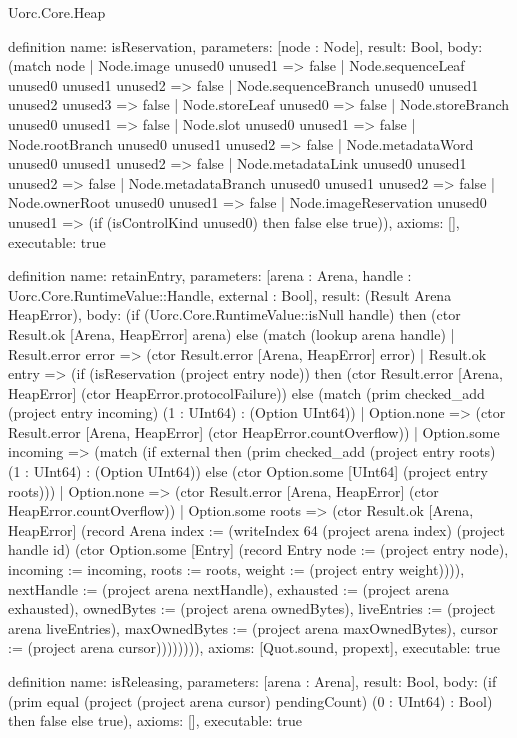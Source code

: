 \begin{lexlean}{Uorc.Core.Heap}
\begin{semanticmodule}
definition{
  name: isReservation,
  parameters: [node : Node],
  result: Bool,
  body: (match node
    | Node.image unused0 unused1 => false
    | Node.sequenceLeaf unused0 unused1 unused2 => false
    | Node.sequenceBranch unused0 unused1 unused2 unused3 => false
    | Node.storeLeaf unused0 => false
    | Node.storeBranch unused0 unused1 => false
    | Node.slot unused0 unused1 => false
    | Node.rootBranch unused0 unused1 unused2 => false
    | Node.metadataWord unused0 unused1 unused2 => false
    | Node.metadataLink unused0 unused1 unused2 => false
    | Node.metadataBranch unused0 unused1 unused2 => false
    | Node.ownerRoot unused0 unused1 => false
    | Node.imageReservation unused0 unused1 => (if (isControlKind unused0) then false else true)),
  axioms: [],
  executable: true
}

definition{
  name: retainEntry,
  parameters: [arena : Arena, handle : Uorc.Core.RuntimeValue::Handle, external : Bool],
  result: (Result Arena HeapError),
  body: (if (Uorc.Core.RuntimeValue::isNull handle) then (ctor Result.ok [Arena, HeapError] arena) else (match (lookup arena handle)
    | Result.error error => (ctor Result.error [Arena, HeapError] error)
    | Result.ok entry => (if (isReservation (project entry node)) then (ctor Result.error [Arena, HeapError] (ctor HeapError.protocolFailure)) else (match (prim checked_add (project entry incoming) (1 : UInt64) : (Option UInt64))
      | Option.none => (ctor Result.error [Arena, HeapError] (ctor HeapError.countOverflow))
      | Option.some incoming => (match (if external then (prim checked_add (project entry roots) (1 : UInt64) : (Option UInt64)) else (ctor Option.some [UInt64] (project entry roots)))
        | Option.none => (ctor Result.error [Arena, HeapError] (ctor HeapError.countOverflow))
        | Option.some roots => (ctor Result.ok [Arena, HeapError] (record Arena {index := (writeIndex 64 (project arena index) (project handle id) (ctor Option.some [Entry] (record Entry {node := (project entry node), incoming := incoming, roots := roots, weight := (project entry weight)}))), nextHandle := (project arena nextHandle), exhausted := (project arena exhausted), ownedBytes := (project arena ownedBytes), liveEntries := (project arena liveEntries), maxOwnedBytes := (project arena maxOwnedBytes), cursor := (project arena cursor)}))))))),
  axioms: [Quot.sound, propext],
  executable: true
}

definition{
  name: isReleasing,
  parameters: [arena : Arena],
  result: Bool,
  body: (if (prim equal (project (project arena cursor) pendingCount) (0 : UInt64) : Bool) then false else true),
  axioms: [],
  executable: true
}


\end{semanticmodule}
\end{lexlean}

